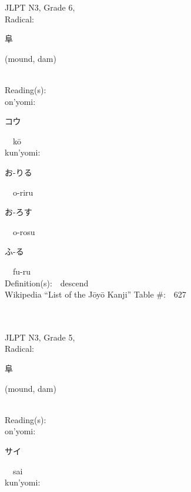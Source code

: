 \begin{multicols}{2}
{JLPT N3, Grade 6, \\Radical:\ \ {\begin{CJK}{UTF8}{min} 阜 \end{CJK}} (mound, dam) } \\
Reading(s):\ \ \\
{\hspace*{1em}}on'yomi:\ \ \\
{\hspace*{2em}}{\begin{CJK}{UTF8}{min} コウ \end{CJK}}\ \ k\=o\ \ \\
{\hspace*{1em}}kun'yomi:\ \ \\
{\hspace*{2em}}{\begin{CJK}{UTF8}{min} お-りる \end{CJK}}\ \ o-riru\ \ \\
{\hspace*{2em}}{\begin{CJK}{UTF8}{min} お-ろす \end{CJK}}\ \ o-rosu\ \ \\
{\hspace*{2em}}{\begin{CJK}{UTF8}{min} ふ-る \end{CJK}}\ \ fu-ru\ \ \\
Definition(s):\ \ descend \\
Wikipedia ``List of the J\=oy\=o Kanji'' Table \#:\ \ 627 \\
\ \ \\
{\fontsize{34pt}{40pt}  }\ \ \\  %
{JLPT N3, Grade 5, \\Radical:\ \ {\begin{CJK}{UTF8}{min} 阜 \end{CJK}} (mound, dam) } \\
Reading(s):\ \ \\
{\hspace*{1em}}on'yomi:\ \ \\
{\hspace*{2em}}{\begin{CJK}{UTF8}{min} サイ \end{CJK}}\ \ sai\ \ \\
{\hspace*{1em}}kun'yomi:\ \ \\

\end{multicols}
